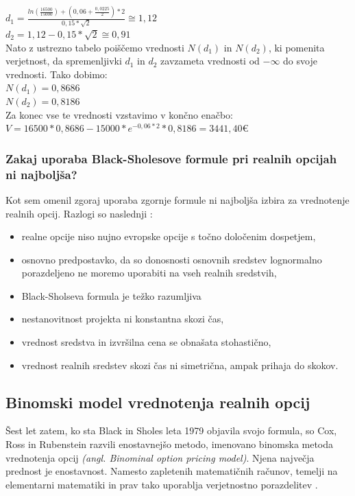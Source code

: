 $d_1 = \tfrac{ln(\tfrac{16500}{15000}) + (0,06 + \tfrac{0,0225}{2})* 2}{0,15* \sqrt{2}} \cong 1,12$\\[0,5 cm]
$d_2 = 1,12 - 0,15 * \sqrt{2} \cong 0,91$ \\

Nato z ustrezno tabelo poiščemo vrednosti $N(d_1)$ in $N(d_2)$, ki pomenita verjetnost, da spremenljivki $d_1$ in $d_2$ zavzameta vrednosti od $-\infty$ do svoje vrednosti. Tako dobimo:\\
$N(d_1) = 0,8686$\\
$N(d_2) = 0,8186$\\

Za konec vse te vrednosti vzstavimo v končno enačbo:\\
$V = 16500 * 0,8686 - 15000 * e^{-0,06*2} * 0,8186 = 3441,40$€\\

\subsubsection{Zakaj uporaba Black-Sholesove formule pri realnih opcijah ni najboljša?}
Kot sem omenil zgoraj uporaba zgornje formule ni najboljša izbira za vrednotenje realnih opcij. Razlogi so naslednji \cite[str. 48, 49]{Brach}:
\begin{itemize}
\item realne opcije niso nujno evropske opcije s točno določenim dospetjem,
\item osnovno predpostavko, da so donosnosti osnovnih sredstev lognormalno porazdeljeno ne moremo uporabiti na vseh realnih sredstvih,
\item Black-Sholseva formula je težko razumljiva
\item nestanovitnost projekta ni konstantna skozi čas,
\item vrednost sredstva in izvršilna cena se obnašata stohastično,
\item vrednost realnih sredstev skozi čas ni simetrična, ampak prihaja do skokov.
\end{itemize}

\subsection{Binomski model vrednotenja realnih opcij}
Šest let zatem, ko sta Black in Sholes leta 1979 objavila svojo formula, so Cox, Ross in Rubenstein razvili enostavnejšo metodo, imenovano binomska metoda vrednotenja opcij \textit{(angl. Binominal option pricing model)}. Njena največja prednost je enostavnost. Namesto zapletenih matematičnih računov, temelji na elementarni matematiki in prav tako uporablja verjetnostno porazdelitev \cite[str. 52]{Brach}. \\

